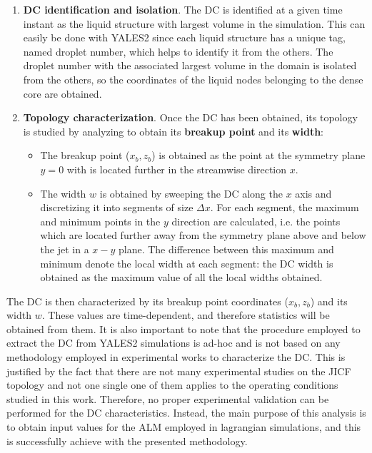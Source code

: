 \begin{enumerate}

	\item \textbf{DC identification and isolation}. The DC is identified at a given time instant as the liquid structure with largest volume in the simulation. This can easily be done with YALES2 since each liquid structure has a unique tag, named droplet number, which helps to identify it from the others. The droplet number with the associated largest volume in the domain is isolated from the others, so the coordinates of the liquid nodes belonging to the dense core are obtained.
	
	\item \textbf{Topology characterization}. Once the DC has been obtained, its topology is studied by analyzing to obtain its \textbf{breakup point} and its \textbf{width}:
	
	\begin{itemize}
	
		\item The breakup point ($x_b, z_b$) is obtained as the point at the symmetry plane $y = 0$ with is located further in the streamwise direction $x$. 
		
		\item The width $w$ is obtained by sweeping the DC along the $x$ axis and discretizing it into segments of size $\Delta x$. For each segment, the maximum and minimum points in the $y$ direction are calculated, i.e. the points which are located further away from the symmetry plane above and below the jet in a $x-y$ plane. The difference between this maximum and minimum denote the local width at each segment: the DC width is obtained as the maximum value of all the local widths obtained.
	
	\end{itemize}
	
\end{enumerate}

The DC is then characterized by its breakup point coordinates ($x_b, z_b$) and its width $w$. These values are time-dependent, and therefore statistics will be obtained from them. It is also important to note that the procedure employed to extract the DC from YALES2 simulations is ad-hoc and is not based on any methodology employed in experimental works to characterize the DC. This is justified by the fact that there are not many experimental studies on the JICF topology and not one single one of them applies to the operating conditions studied in this work. Therefore, no proper experimental validation can be performed for the DC characteristics. Instead, the main purpose of this analysis is to obtain input values for the ALM employed in lagrangian simulations, and this is successfully achieve with the presented methodology.

